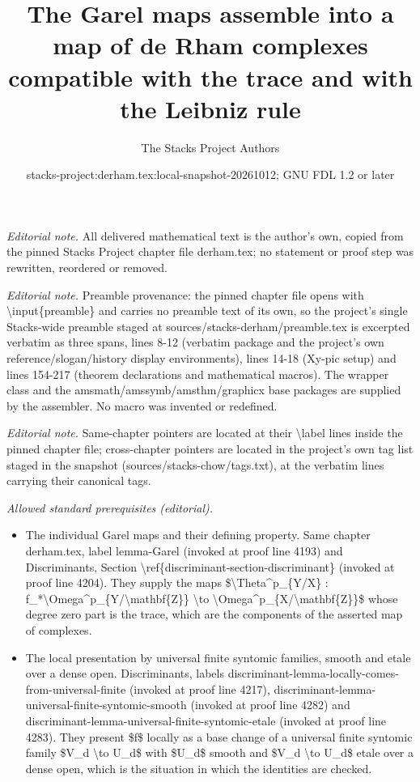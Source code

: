 \documentclass[10pt,a4paper]{amsart}
\title{The Garel maps assemble into a map of de Rham complexes compatible with the trace and with the Leibniz rule}
\author{The Stacks Project Authors}
\date{stacks-project:derham.tex:local-snapshot-20261012; GNU FDL 1.2 or later}
\theoremstyle{plain}
\theoremstyle{definition}
\theoremstyle{remark}
\numberwithin{equation}{subsection}
\begin{document}
\maketitle
\noindent\textit{Editorial note.} All delivered mathematical text is the author's own, copied from the pinned Stacks Project chapter file derham.tex; no statement or proof step was rewritten, reordered or removed.\par\medskip
\noindent\textit{Editorial note.} Preamble provenance: the pinned chapter file opens with \textbackslash{}input\{preamble\} and carries no preamble text of its own, so the project's single Stacks-wide preamble staged at sources/stacks-derham/preamble.tex is excerpted verbatim as three spans, lines 8-12 (verbatim package and the project's own reference/slogan/history display environments), lines 14-18 (Xy-pic setup) and lines 154-217 (theorem declarations and mathematical macros). The wrapper class and the amsmath/amssymb/amsthm/graphicx base packages are supplied by the assembler. No macro was invented or redefined.\par\medskip
\noindent\textit{Editorial note.} Same-chapter pointers are located at their \textbackslash{}label lines inside the pinned chapter file; cross-chapter pointers are located in the project's own tag list staged in the snapshot (sources/stacks-chow/tags.txt), at the verbatim lines carrying their canonical tags.\par\medskip
\noindent\textit{Allowed standard prerequisites (editorial).}\begin{itemize}
\item The individual Garel maps and their defining property. Same chapter derham.tex, label lemma-Garel (invoked at proof line 4193) and Discriminants, Section \textbackslash{}ref\{discriminant-section-discriminant\} (invoked at proof line 4204). They supply the maps \$\textbackslash{}Theta\textasciicircum{}p\_\{Y/X\} : f\_*\textbackslash{}Omega\textasciicircum{}p\_\{Y/\textbackslash{}mathbf\{Z\}\} \textbackslash{}to \textbackslash{}Omega\textasciicircum{}p\_\{X/\textbackslash{}mathbf\{Z\}\}\$ whose degree zero part is the trace, which are the components of the asserted map of complexes.
\item The local presentation by universal finite syntomic families, smooth and etale over a dense open. Discriminants, labels discriminant-lemma-locally-comes-from-universal-finite (invoked at proof line 4217), discriminant-lemma-universal-finite-syntomic-smooth (invoked at proof line 4282) and discriminant-lemma-universal-finite-syntomic-etale (invoked at proof line 4283). They present \$f\$ locally as a base change of a universal finite syntomic family \$V\_d \textbackslash{}to U\_d\$ with \$U\_d\$ smooth and \$V\_d \textbackslash{}to U\_d\$ etale over a dense open, which is the situation in which the identities are checked.
\end{itemize}\medskip
\end{document}
